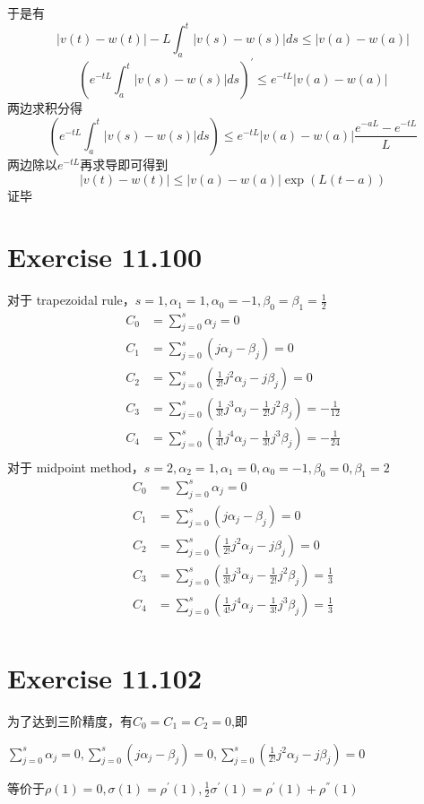 \documentclass[twoside,a4paper]{article}
\begin{document}
于是有
$$
|v(t) - w(t)| -L\int_a^t |v(s) - w(s)|ds \leq |v(a) - w(a)|
$$
$$
(e^{-tL}\int_a^t |v(s) - w(s)|ds)^{'} \leq e^{-tL}|v(a) - w(a)|
$$
两边求积分得
$$
(e^{-tL}\int_a^t |v(s) - w(s)|ds) \leq e^{-tL}|v(a) - w(a)|\frac{e^{-aL}-e^{-tL}}{L}
$$
两边除以$e^{-tL}$再求导即可得到
$$|v(t) - w(t)| \leq |v(a) - w(a)|\exp(L(t-a))$$ 证毕


\section{Exercise 11.100}

对于 trapezoidal rule，$s=1,\alpha_1=1,\alpha_0=-1,\beta_0=\beta_1=\frac{1}{2}$
$$\begin{aligned}
  C_0&=\sum_{j=0}^s\alpha_j=0\\
  C_1&=\sum_{j=0}^s(j\alpha_j-\beta_j)=0\\
  C_2&=\sum_{j=0}^s(\frac{1}{2!}j^2\alpha_j-j\beta_j)=0\\
  C_3&=\sum_{j=0}^s(\frac{1}{3!}j^3\alpha_j-\frac{1}{2!}j^2\beta_j)=-\frac{1}{12}\\
  C_4&=\sum_{j=0}^s(\frac{1}{4!}j^4\alpha_j-\frac{1}{3!}j^3\beta_j)=-\frac{1}{24}\\
  \end{aligned}$$
  对于 midpoint method，$s=2,\alpha_2=1,\alpha_1=0,\alpha_0=-1,\beta_0=0,\beta_1=2$
  $$\begin{aligned}
    C_0&=\sum_{j=0}^s\alpha_j=0\\
    C_1&=\sum_{j=0}^s(j\alpha_j-\beta_j)=0\\
    C_2&=\sum_{j=0}^s(\frac{1}{2!}j^2\alpha_j-j\beta_j)=0\\
    C_3&=\sum_{j=0}^s(\frac{1}{3!}j^3\alpha_j-\frac{1}{2!}j^2\beta_j)=\frac{1}{3}\\
    C_4&=\sum_{j=0}^s(\frac{1}{4!}j^4\alpha_j-\frac{1}{3!}j^3\beta_j)=\frac{1}{3}\\
    \end{aligned}$$
    
\section{Exercise 11.102}
    为了达到三阶精度，有$C_0=C_1=C_2=0$,即

    $\sum_{j=0}^s\alpha_j=0,\sum_{j=0}^s(j\alpha_j-\beta_j)=0,\sum_{j=0}^s(\frac{1}{2!}j^2\alpha_j-j\beta_j)=0$

    等价于$\rho(1)=0,\sigma(1)=\rho^{'}(1),\frac{1}{2}\sigma^{'}(1)=\rho^{'}(1)+\rho^{''}(1)$
\end{document}
